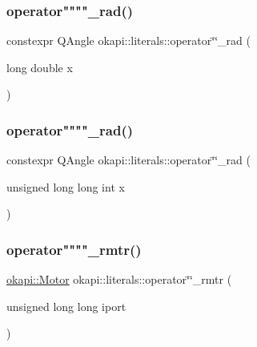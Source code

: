 \mbox{\label{namespaceokapi_1_1literals_a07f1b869e43b86032c308adad74d32fe}} 
\subsubsection{\texorpdfstring{operator""""\_rad()}{operator""\_rad()}\hspace{0.1cm}{\footnotesize\ttfamily [1/2]}}
{\footnotesize\ttfamily constexpr Q\+Angle okapi\+::literals\+::operator\char`\"{}\char`\"{}\+\_\+rad (\begin{DoxyParamCaption}\item[{long double}]{x }\end{DoxyParamCaption})}

\mbox{\label{namespaceokapi_1_1literals_a81747a819272e667c22af7e4b6964de9}} 
\subsubsection{\texorpdfstring{operator""""\_rad()}{operator""\_rad()}\hspace{0.1cm}{\footnotesize\ttfamily [2/2]}}
{\footnotesize\ttfamily constexpr Q\+Angle okapi\+::literals\+::operator\char`\"{}\char`\"{}\+\_\+rad (\begin{DoxyParamCaption}\item[{unsigned long long int}]{x }\end{DoxyParamCaption})}

\mbox{\label{namespaceokapi_1_1literals_a396af6caf649c912001004f9155c1c2c}} 
\subsubsection{\texorpdfstring{operator""""\_rmtr()}{operator""\_rmtr()}}
{\footnotesize\ttfamily \mbox{\hyperlink{classokapi_1_1Motor}{okapi\+::\+Motor}} okapi\+::literals\+::operator\char`\"{}\char`\"{}\+\_\+rmtr (\begin{DoxyParamCaption}\item[{unsigned long long}]{iport }\end{DoxyParamCaption})}

